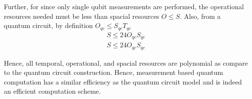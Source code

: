 \documentclass[twocolumn,secnumarabic,amssymb, nobibnotes, aps, prd]{revtex4-2}
\begin{document}
Further, for since only single qubit measurements are performed, the operational resources needed must be less than spacial resources $O \le S$. Also, from a quantum circuit, by definition $O_{qc} \le S_{qc}T_{qc}$
\begin{align*}
    S \le 24 O_{qc}S_{qc}\\
    S \le 24 O_{qc}S_{qc}
\end{align*}

Hence, all temporal, operational, and spacial resources are polynomial as compare to the quantum circuit construction. Hence, measurement based quantum computation has a similar efficiency as the quantum circuit model and is indeed an efficient computation scheme.
\end{document}
